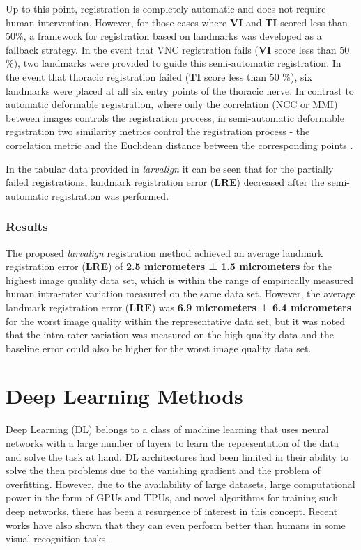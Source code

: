 \documentclass{report}
\begin{document}
	Up to this point, registration is completely automatic and does not require human intervention. However, for those cases where \textbf{VI} and \textbf{TI} scored less than 50\%, a framework for registration based on landmarks was developed as a fallback strategy. In the event that VNC registration fails (\textbf{VI} score less than 50 \%), two landmarks were provided to guide this semi-automatic registration. In the event that thoracic registration failed (\textbf{TI} score less than 50 \%), six landmarks were placed at all six entry points of the thoracic nerve.	In contrast to automatic deformable registration, where only the correlation (NCC or MMI) between images controls the registration process, in semi-automatic deformable registration two similarity metrics control the registration process - the correlation metric and the Euclidean distance between the corresponding points \cite{inproceedings}.
	
	In the tabular data provided in \textit{larvalign} \cite{larvalign} it can be seen that for the partially failed registrations, landmark registration error (\textbf{LRE}) decreased after the semi-automatic registration was performed.
	
	\subsubsection{Results}
	\label{subsubsection:result}
	The proposed \emph{{larvalign}} registration method achieved an average landmark registration error (\textbf{LRE}) of \textbf{2.5 micrometers ± 1.5 micrometers} for the highest image quality data set, which is within the range of empirically measured human intra-rater variation measured on the same data set. However, the average landmark registration error (\textbf{LRE}) was \textbf{6.9 micrometers ± 6.4 micrometers} for the worst image quality within the representative data set, but it was noted that the intra-rater variation was measured on the high quality data and the baseline error could also be higher for the worst image quality data set.
	
	\section{Deep Learning Methods}
	\label{section:dl}
	
	Deep Learning (DL) belongs to a class of machine learning that uses neural networks with a large number of layers to learn the representation of the data and solve the task at hand. DL architectures had been limited in their ability to solve the then problems due to the vanishing gradient and the problem of overfitting. However, due to the availability of large datasets, large computational power in the form of GPUs and TPUs, and novel algorithms for training such deep networks, there has been a resurgence of interest in this concept. Recent works have also shown that they can even perform better than humans in some visual recognition tasks.
	
\end{document}
